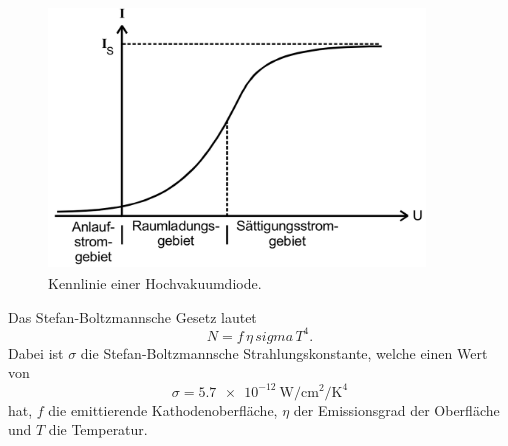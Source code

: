 \begin{figure}
    \centering
    \includegraphics[width=10cm, height=7cm]{build/gebiete.png}
    \caption{Kennlinie einer Hochvakuumdiode. \cite{V504}}
    \label{fig:gebiete}
\end{figure}


\noindent Das Stefan-Boltzmannsche Gesetz lautet
\begin{equation*}
    N = f \, \eta \, sigma \, T^4.
\end{equation*}
Dabei ist $\sigma$ die Stefan-Boltzmannsche Strahlungskonstante,
welche einen Wert von
\begin{equation*}
    \sigma = \SI{5.7e-12}{\watt\per\centi\meter\squared\per\kelvin\tothe{4}}
\end{equation*}
hat, $f$ die emittierende Kathodenoberfläche, $\eta$ der
Emissionsgrad der Oberfläche und $T$ die Temperatur.
